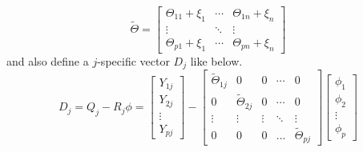 \documentclass[11pt]{article}
\begin{document}
\begin{itemize}
$$\tilde{\Theta} = 
\begin{bmatrix}
\Theta_{11} + \xi_1 & \cdots & \Theta_{1n} + \xi_n\\
\vdots & \ddots & \vdots\\
\Theta_{p1}+\xi_1 & \cdots & \Theta_{pn} + \xi_n
\end{bmatrix}
$$
\noindent and also define a $j$-specific vector $D_j$ like below.
$$D_j = Q_j-R_j\phi = \begin{bmatrix} Y_{1j} \\ Y_{2j} \\ \vdots \\ Y_{pj} \end{bmatrix} - \begin{bmatrix}
\tilde{\Theta}_{1j} & 0 & 0 &\cdots & 0\\
0 & \tilde{\Theta}_{2j} & 0 & \cdots & 0\\
\vdots & \vdots & \vdots & \ddots & \vdots \\
0 & 0 & 0 & ... & \tilde{\Theta}_{pj}
\end{bmatrix}
\begin{bmatrix}
\phi_1\\
\phi_2\\
\vdots\\
\phi_p
\end{bmatrix}
$$


\end{itemize}
\end{document}
